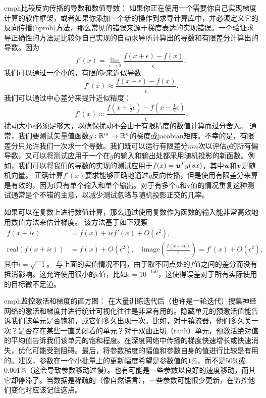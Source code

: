 emph{比较反向传播的导数和数值导数}：
如果你正在使用一个需要你自己实现梯度计算的软件框架，或者如果你添加一个新的操作到求导计算库中，并必须定义它的反向传播(bprob)方法，那么常见的错误来源于梯度表达的实现错误。一个验证求导正确性的方法是比较你自己实现的自动求导所计算出的导数和有限差分计算出的导数。因为
\begin{equation}
    f'(x) = \lim_{\epsilon \to 0} \frac{f(x+\epsilon) - f(x)}{\epsilon},
\end{equation}
我们可以通过一个小的，有限的$\epsilon$来近似导数
\begin{equation}
    f'(x) \approx \frac{f(x+\epsilon) - f(x)}{\epsilon}.
\end{equation}
我们可以通过中心差分来提升近似精度：
\begin{equation}
    f'(x) \approx \frac{ f(x+\frac{1}{2}\epsilon) - f(x-\frac{1}{2}\epsilon) }{\epsilon}.
\end{equation}
扰动大小$\epsilon$必须足够大，以确保扰动不会由于有限精度的数值计算而过分舍入。
通常，我们要测试矢量值函数$g:\mathbb{R}^m \to \mathbb{R}^n$的梯度或\gls{jacobian}矩阵。不幸的是，有限差分只允许我们一次求一个导数。我们既可以运行有限差分$mn$次以评估$g$的所有偏导数，又可以将测试应用于一个在$g$的输入和输出处都采用随机投影的新函数。例如，我们可以将我们的导数的实现的测试应用于$f(x) = \boldsymbol{\mathit{u}}^T g(\boldsymbol{\mathit{v}} x)$，其中$\boldsymbol{\mathit{u}}$和$\boldsymbol{\mathit{v}}$是随机向量。
正确计算$f'(x)$要求能够正确地通过$g$反向传播，但是使用有限差分来算是有效的，因为f只有单个输入和单个输出。对于有多个u和v值的情况重复这种测试通常是个不错的主意，以减少测试忽略与随机投影正交的几率。

如果可以在复数上进行数值计算，那么通过使用复数作为函数的输入能非常高效地用数值方法来估计梯度\citep{Squire+Trapp-1998}。
该方法基于如下观察
\begin{align}
    f(x + i\epsilon) &= f(x) + i\epsilon f'(x) + O(\epsilon^2) ,\\
    \text{real}( f(x+i\epsilon) ) &= f(x) + O(\epsilon^2), \quad \text{image}( \frac{f(x+i\epsilon)}{ \epsilon } ) = f'(x) + O(\epsilon^2),
\end{align}
其中$i=\sqrt{-1}$。
与上面的实值情况不同，由于取不同点处的$f$值之间的差分而没有抵消影响。这允许使用很小的$\epsilon$值，比如$\epsilon = 10^{-150}$，这使得误差对于所有实际使用的目标微不足道。

emph{监控激活和梯度的直方图}：
在大量训练迭代后（也许是一轮迭代）搜集神经网络的激活和梯度并进行统计可视化往往是非常有用的。隐藏单元的预激活值能告诉我们该单元是否饱和，或它们多久出现一次。比如，对于镇流器，他们多久关一次？是否存在某些一直关闭着的单元？对于双曲正切（tanh）单元，预激活绝对值的平均值告诉我们该单元的饱和程度。在深度网络中传播的梯度快速增长或快速消失，优化可能受到阻碍。最后，将参数梯度的幅值和参数自身的值进行比较是有用的。\citep{Bottou-DLSS2015}建议，参数在一个小批量上的更新幅度希望是参数值的$1\%$，而不是$50\%$或$0.001\%$（这会导致参数移动过慢）。也有可能是一些参数以良好的速度移动，而其它却停滞了。当数据是稀疏的（像自然语言），一些参数可能很少更新，在监控他们变化时应该记住这点。

